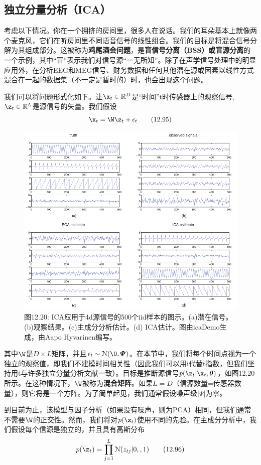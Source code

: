 \documentclass[a4paper]{article}
\begin{document}
\subsection{独立分量分析（ICA）}
考虑以下情况。你在一个拥挤的房间里，很多人在说话。我们的耳朵基本上就像两个麦克风，它们在听房间里不同语音信号的线性组合。我们的目标是将混合信号分解为其组成部分。这被称为\textbf{鸡尾酒会问题}，是\textbf{盲信号分离（BSS）或盲源分离}的一个示例，其中“盲”表示我们对信号源“一无所知”。除了在声学信号处理中的明显应用外，在分析EEG和MEG信号、财务数据和任何其他潜在源或因素以线性方式混合在一起的数据集（不一定是暂时的）时，也会出现这个问题。 

我们可以将问题形式化如下。让$\x_t\in \mathbb{R}^D$是“时间”t时传感器上的观察信号,$\z_t\in \mathbb{R}^L$是源信号的矢量。我们假设 
\begin{equation}
	\x_t=\W\z_t+\epsilon_t\tag{12.95}
\end{equation}

\begin{figure}[h]
	\centering
	\includegraphics[width=0.7\linewidth]{fig/figure20}
	\caption*{图12.20: ICA应用于4d源信号的500个iid样本的图示。(a)潜在信号。(b)观察结果。(c)主成分分析估计。(d) ICA估计。图由icaDemo生成，由Aapo Hyvarinen编写。}
\end{figure}
其中$\W$是$D\times L$矩阵，并且$\epsilon_t\sim\mathcal{N}(\0,\boldsymbol{\varPsi})$。在本节中，我们将每个时间点视为一个独立的观察值，即我们不建模时间相关性（因此我们可以用i代替t指数，但我们坚持用t与许多独立分量分析文献一致）。目标是推断源信号$p(\z_t|\x_t,\boldsymbol{\theta})$，如图12.20所示。在这种情况下，$\W$被称为\textbf{混合矩阵}。如果$L=D$（信源数量=传感器数量），则它将是一个方阵。为了简单起见，我们通常假设噪声级$|\boldsymbol{\varPsi}|$为零。 

到目前为止，该模型与因子分析（如果没有噪声，则为PCA）相同，但我们通常不需要$\W$的正交性。然而，我们将对$p(\z_t)$使用不同的先验。在主成分分析中，我们假设每个信源是独立的，并且具有高斯分布 
\begin{equation}
	p(\z_t)=\prod_{j=1}^{L}\mathcal{N}(z_{tj}|0,,1)\tag{12.96}
\end{equation}
\end{document}
